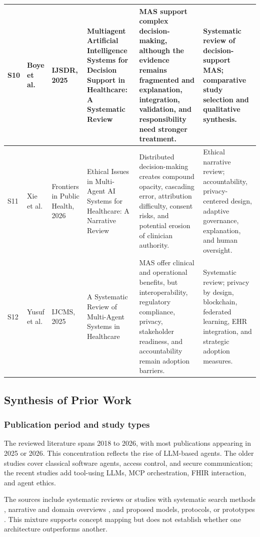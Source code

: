 \documentclass[11pt,a4paper]{article}
\begin{document}
\begin{longtable}{|L{0.65cm}|L{1.85cm}|L{1.90cm}|L{3.10cm}|L{3.80cm}|L{2.90cm}|}
\hline
S10 & Boye et al. & IJSDR, 2025 & Multiagent Artificial Intelligence Systems for Decision Support in Healthcare: A Systematic Review \cite{boye2025decision} & MAS support complex decision-making, although the evidence remains fragmented and explanation, integration, validation, and responsibility need stronger treatment. & Systematic review of decision-support MAS; comparative study selection and qualitative synthesis. \\
\hline
S11 & Xie et al. & Frontiers in Public Health, 2026 & Ethical Issues in Multi-Agent AI Systems for Healthcare: A Narrative Review \cite{xie2026ethical} & Distributed decision-making creates compound opacity, cascading error, attribution difficulty, consent risks, and potential erosion of clinician authority. & Ethical narrative review; accountability, privacy-centered design, adaptive governance, explanation, and human oversight. \\
\hline
S12 & Yusuf et al. & IJCMS, 2025 & A Systematic Review of Multi-Agent Systems in Healthcare \cite{yusuf2025systematic} & MAS offer clinical and operational benefits, but interoperability, regulatory compliance, privacy, stakeholder readiness, and accountability remain adoption barriers. & Systematic review; privacy by design, blockchain, federated learning, EHR integration, and strategic adoption measures. \\
\end{longtable}
\endgroup

\subsection{Synthesis of Prior Work}

\subsubsection{Publication period and study types}

The reviewed literature spans 2018 to 2026, with most publications appearing in 2025 or 2026. This concentration reflects the rise of LLM-based agents. The older studies cover classical software agents, access control, and secure communication; the recent studies add tool-using LLMs, MCP orchestration, FHIR interaction, and agent ethics.

The sources include systematic reviews or studies with systematic search methods \cite{becker2018survey,gorenshtein2025clinical,ode2025evidence,boye2025decision,yusuf2025systematic}, narrative and domain overviews \cite{saeed2025applications,okeke2025overview,xie2026ethical}, and proposed models, protocols, or prototypes \cite{khan2019ibac,naresh2020quantum,demaio2025privacy,shehab2025agentic}. This mixture supports concept mapping but does not establish whether one architecture outperforms another.
\end{document}
